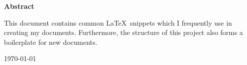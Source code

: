 \begin{titlepage}
   \begin{center}
       \vspace*{1cm}

       \Huge
       \textbf{\doctitle}

       \vspace{1cm}
       \LARGE
       \docsubtitle
            
       \vspace{4cm}
       \vspace{0.9cm}
       \large
       \textbf{Abstract}

       \vspace{0.5cm}
       \normalsize
       \begin{justify}
           This document contains common \LaTeX\ snippets which I 
        frequently use in creating my documents. Furthermore, the structure
        of this project also forms a boilerplate for new documents.
       \end{justify}

       \vfill
       \large
       \textbf{\authorname}
       \normalsize

       \ifdefined\authoremail
           \vspace{0.2cm}
           \href{mailto:\authoremail}{\authoremail}
       \fi

       \vspace{0.2cm}
       \today
            
   \end{center}
\end{titlepage}
